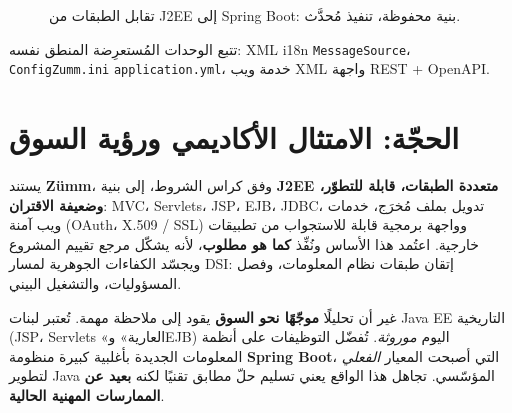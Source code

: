 \begin{figure}[htbp]
\centering
{}
\caption{تقابل الطبقات من J2EE إلى Spring Boot: بنية محفوظة، تنفيذ مُحدَّث.}
\label{fig:migration-couches}
\end{figure}

تتبع الوحدات المُستعرِضة المنطق نفسه: XML i18n \textrightarrow{}
\texttt{MessageSource}، \texttt{ConfigZumm.ini} \textrightarrow{}
\texttt{application.yml}، خدمة ويب XML \textrightarrow{} واجهة REST + OpenAPI.

\section{الحجّة: الامتثال الأكاديمي ورؤية السوق}
يستند \textbf{Zümm}، وفق كراس الشروط، إلى بنية \textbf{J2EE متعددة الطبقات،
قابلة للتطوّر، وضعيفة الاقتران}: MVC، Servlets، JSP، EJB، JDBC، تدويل بملف
مُخرَج، خدمات ويب آمنة (OAuth، X.509 / SSL) وواجهة برمجية قابلة للاستجواب من
تطبيقات خارجية. اعتُمد هذا الأساس ونُفِّذ \textbf{كما هو مطلوب}، لأنه يشكّل مرجع
تقييم المشروع ويجسّد الكفاءات الجوهرية لمسار DSI: إتقان طبقات نظام المعلومات،
وفصل المسؤوليات، والتشغيل البيني.

غير أن تحليلًا \textbf{موجّهًا نحو السوق} يقود إلى ملاحظة مهمة. تُعتبر لبنات
Java EE التاريخية (JSP، Servlets «العارية» وEJB) اليوم \emph{موروثة}. تُفضّل
التوظيفات على أنظمة المعلومات الجديدة بأغلبية كبيرة منظومة \textbf{Spring Boot}،
التي أصبحت المعيار \emph{الفعلي} لتطوير Java المؤسّسي. تجاهل هذا الواقع يعني
تسليم حلّ مطابق تقنيًا لكنه \textbf{بعيد عن الممارسات المهنية الحالية}.

